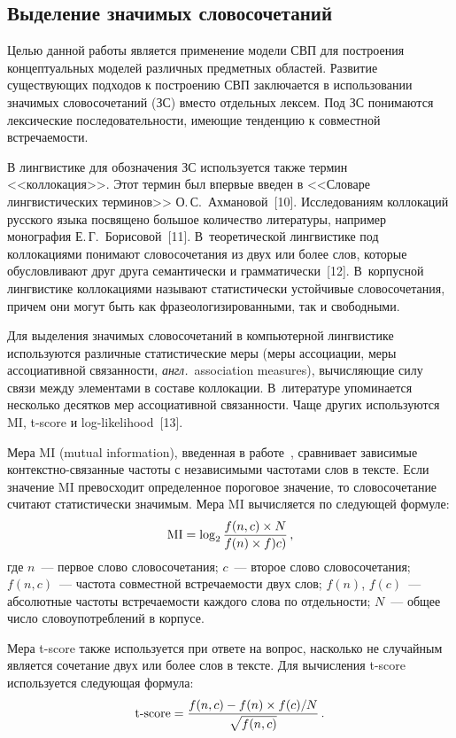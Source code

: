 \begin{multicols}{2}
\section{Выделение значимых словосочетаний}

Целью данной работы является применение модели СВП для построения 
концептуальных моделей различных предметных областей. Развитие 
существующих подходов к построению СВП заключается в использовании 
значимых словосочетаний (ЗС) вместо отдельных лексем. Под ЗС
 понимаются лексические последовательности, 
имеющие тенденцию к совместной встречаемости. 
     
     В лингвистике для обозначения ЗС
используется также термин <<коллокация>>. Этот термин был впервые 
введен в <<Словаре лингвистических терминов>> О.\,С.~Ахмановой~[10]. 
Исследованиям коллока\-ций русского языка посвящено большое 
количество литературы, например монография Е.\,Г.~Борисовой~[11]. 
В~теоретической лингвистике под коллокациями понимают 
словосочетания из двух или более слов, которые обусловливают друг друга 
семантически и грамматически~[12]. В~корпусной лингвистике 
коллокациями называют статистически устойчивые словосочетания, 
причем они могут быть как фразеологизированными, так и свободными.
     
     Для выделения значимых словосочетаний в компьютерной 
лингвистике используются различные статистические меры (меры 
ассоциации, меры ассоциативной связанности, \textit{англ.}\ association measures), 
вычисляющие силу связи между элементами в составе коллокации. 
В~литературе упоминается несколько десятков мер ассоциативной 
свя\-зан\-ности. Чаще других используются MI, t-score и log-likelihood~[13].

Мера MI (mutual information), введенная в работе~\cite{14-mor}, сравнивает 
зависимые кон\-текст\-но-свя\-зан\-ные час\-то\-ты с независимыми 
частотами слов в тексте. Если значение MI превосходит определенное 
пороговое значение, то словосочетание считают статистически значимым. 
Мера MI вычисляется по следующей формуле:
$$
\mathrm{MI}=\log_2\displaystyle\frac{\displaystyle f(n,c)\times N\mathstrut}{\displaystyle f(n)\times f)c)\mathstrut}\,,
$$
где $n$~--- первое слово словосочетания; $c$~--- второе слово 
словосочетания; $f(n,c)$~--- частота совместной встречаемости двух слов; 
$f(n)$, $f(c)$~--- абсолютные частоты встречаемости каждого слова по 
отдельности; $N$~--- общее число словоупотреблений в корпусе.

Мера t-score также используется при ответе на вопрос, насколько не 
случайным является сочетание двух или более слов в тексте. Для 
вычисления t-score используется следующая формула:
$$
\mathrm{t}\mbox{-}\mathrm{score}=\displaystyle\frac{\displaystyle f(n,c)-f(n)\times 
f(c)/N\mathstrut}{\displaystyle \sqrt{f(n,c)}\mathstrut}\,.
$$


\end{multicols}
